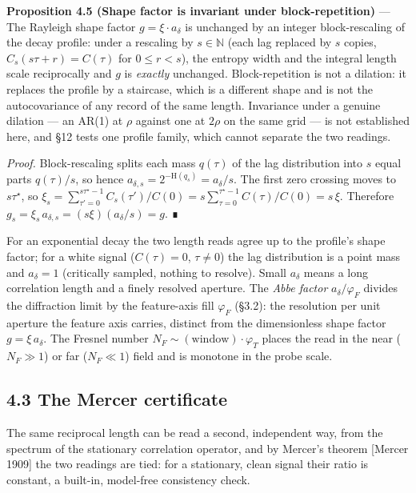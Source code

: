 \documentclass[10pt,letterpaper,twocolumn]{article}
\begin{document}
\textbf{Proposition 4.5 (Shape factor is invariant under block-repetition)} --- The Rayleigh shape factor \(g=\xi\cdot a_\delta\) is unchanged by an integer block-rescaling of the decay profile: under a rescaling by \(s\in\mathbb N\) (each lag replaced by \(s\) copies, \(C_s(s\tau+r)=C(\tau)\) for \(0\le r<s\)), the entropy width and the integral length scale reciprocally and \(g\) is \emph{exactly} unchanged. Block-repetition is not a dilation: it replaces the profile by a staircase, which is a different shape and is not the autocovariance of any record of the same length. Invariance under a genuine dilation --- an AR(1) at \(\rho\) against one at \(2\rho\) on the same grid --- is not established here, and §12 tests one profile family, which cannot separate the two readings.

\emph{Proof.} Block-rescaling splits each mass \(q(\tau)\) of the lag distribution into \(s\) equal parts \(q(\tau)/s\), so
hence \(a_{\delta,s}=2^{-\mathrm H(q_s)}=a_\delta/s\). The first zero crossing moves to \(s\tau^\star\), so \(\xi_s=\sum_{\tau'=0}^{s\tau^\star-1}C_s(\tau')/C(0)=s\sum_{\tau=0}^{\tau^\star-1}C(\tau)/C(0)=s\,\xi\). Therefore \(g_s=\xi_s\,a_{\delta,s}=(s\xi)(a_\delta/s)=g\). ∎

For an exponential decay the two length reads agree up to the profile's shape factor; for a white signal (\(C(\tau)=0\), \(\tau\ne0\)) the lag distribution is a point mass and \(a_\delta=1\) (critically sampled, nothing to resolve). Small \(a_\delta\) means a long correlation length and a finely resolved aperture. The \emph{Abbe factor} \(a_\delta/\varphi_F\) divides the diffraction limit by the feature-axis fill \(\varphi_F\) (§3.2): the resolution per unit aperture the feature axis carries, distinct from the dimensionless shape factor \(g=\xi\,a_\delta\). The Fresnel number \(N_F\sim(\text{window})\cdot\varphi_T\) places the read in the near (\(N_F\gg1\)) or far (\(N_F\ll1\)) field and is monotone in the probe scale.

\subsection{4.3 The Mercer certificate}\label{43-the-mercer-certificate}

The same reciprocal length can be read a second, independent way, from the spectrum of the stationary correlation operator, and by Mercer's theorem {[}Mercer 1909{]} the two readings are tied: for a stationary, clean signal their ratio is constant, a built-in, model-free consistency check.
\end{document}
